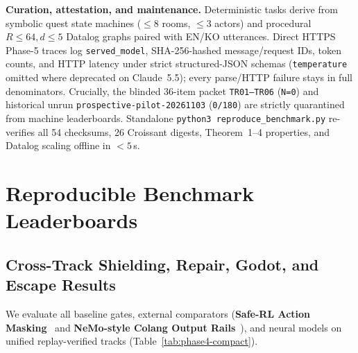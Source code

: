 \textbf{Curation, attestation, and maintenance.} Deterministic tasks derive from symbolic quest state machines (${\le}8$ rooms, ${\le}3$ actors) and procedural $R{\le}64, d{\le}5$ Datalog graphs paired with EN/KO utterances. Direct HTTPS Phase-5 traces log \texttt{served\_model}, SHA-256-hashed message/request IDs, token counts, and HTTP latency under strict structured-JSON schemas (\texttt{temperature} omitted where deprecated on Claude~5.5); every parse/HTTP failure stays in full denominators. Crucially, the blinded 36-item packet \texttt{TR01--TR06} (\texttt{N=0}) and historical unrun \texttt{prospective-pilot-20261103} (\texttt{0/180}) are strictly quarantined from machine leaderboards. Standalone \texttt{python3 reproduce\_benchmark.py} re-verifies all 54 checksums, 26 Croissant digests, Theorem~1--4 properties, and Datalog scaling offline in $<5$\,s.

\section{Reproducible Benchmark Leaderboards}\label{sec:eval}
\subsection{Cross-Track Shielding, Repair, Godot, and Escape Results}\label{sec:phase4-compact}
We evaluate all baseline gates, external comparators (\textbf{Safe-RL Action Masking}~\cite{alshiekh2018shield} and \textbf{NeMo-style Colang Output Rails}~\cite{rebedea2023nemo}), and neural models on unified replay-verified tracks (Table~\ref{tab:phase4-compact}).

